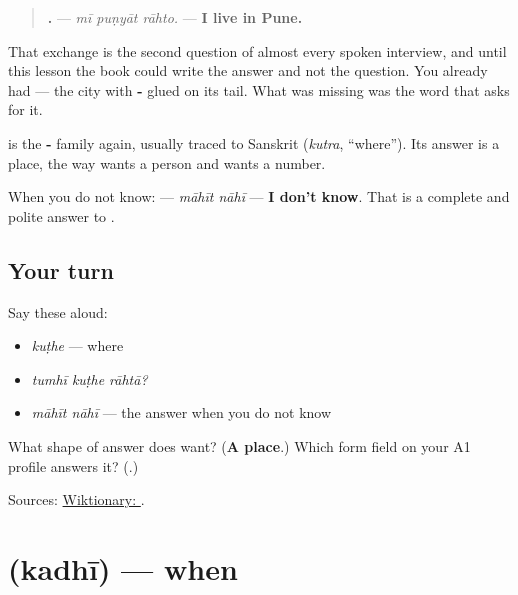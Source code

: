 \begin{quote}
\textbf{  .} — \emph{mī puṇyāt rāhto.} — \textbf{I live in Pune.}
\end{quote}

That exchange is the second question of almost every spoken interview, and until this lesson the book could write the answer and not the question. You already had \textbf{} — the city with \textbf{-} glued on its tail. What was missing was the word that asks for it.

\textbf{} is the \textbf{-} family again, usually traced to Sanskrit \textbf{} (\emph{kutra}, \textquotedblleft{}where\textquotedblright{}). Its answer is a place, the way \textbf{} wants a person and \textbf{} wants a number.

When you do not know: \textbf{ } — \emph{māhīt nāhī} — \textbf{I don't know}. That is a complete and polite answer to \textbf{}.

\subsection*{Your turn}
Say these aloud:

\begin{itemize}
\raggedright
  \item \emph{kuṭhe} — where
  \item \emph{tumhī kuṭhe rāhtā?}
  \item \emph{māhīt nāhī} — the answer when you do not know
\end{itemize}

\begin{tcolorbox}[breakable,colback=teal!4,colframe=teal!35!black,title={Before you move on}]
What shape of answer does \textbf{} want? (\textbf{A place}.) Which form field on your A1 profile answers it? (\textbf{}.)

Sources: \href{https://en.wiktionary.org/wiki/\%E0\%A4\%95\%E0\%A5\%81\%E0\%A4\%A0\%E0\%A5\%87}{Wiktionary: }.
\end{tcolorbox}
\section[\texorpdfstring{\mr{कधी} (kadhī)}{कधी (kadhī)}]{ (kadhī) — when}

\label{lesson:MR-C38-kadhi}



